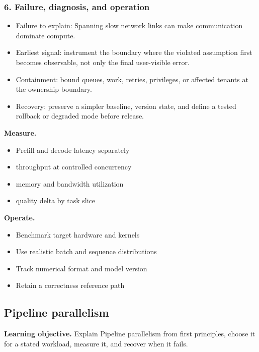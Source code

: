 \subsubsection*{6. Failure, diagnosis, and operation}
\begin{itemize}
\item Failure to explain: Spanning slow network links can make communication dominate compute.
\item Earliest signal: instrument the boundary where the violated assumption first becomes observable, not only the final user-visible error.
\item Containment: bound queues, work, retries, privileges, or affected tenants at the ownership boundary.
\item Recovery: preserve a simpler baseline, version state, and define a tested rollback or degraded mode before release.
\end{itemize}
\textbf{Measure.}\begin{itemize}
\item Prefill and decode latency separately
\item throughput at controlled concurrency
\item memory and bandwidth utilization
\item quality delta by task slice
\end{itemize}
\textbf{Operate.}\begin{itemize}
\item Benchmark target hardware and kernels
\item Use realistic batch and sequence distributions
\item Track numerical format and model version
\item Retain a correctness reference path
\end{itemize}
\subsection{Pipeline parallelism}
\textbf{Learning objective.} Explain Pipeline parallelism from first principles, choose it for a stated workload, measure it, and recover when it fails.
